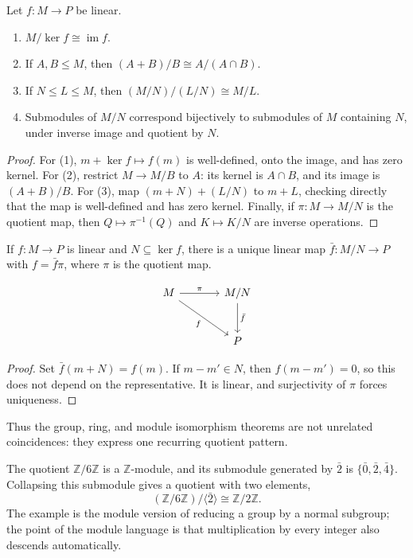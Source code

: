 \begin{theorem}
Let \(f:M\to P\) be linear.
\begin{enumerate}
\item \(M/\ker f\cong\operatorname{im}f\).
\item If \(A,B\leq M\), then \((A+B)/B\cong A/(A\cap B)\).
\item If \(N\leq L\leq M\), then \((M/N)/(L/N)\cong M/L\).
\item Submodules of \(M/N\) correspond bijectively to submodules of \(M\)
containing \(N\), under inverse image and quotient by \(N\).
\end{enumerate}
\end{theorem}
\begin{proof}
For (1), \(m+\ker f\mapsto f(m)\) is well-defined, onto the image, and has
zero kernel. For (2), restrict \(M\to M/B\) to \(A\): its kernel is
\(A\cap B\), and its image is \((A+B)/B\). For (3), map
\((m+N)+(L/N)\) to \(m+L\), checking directly that the map is well-defined
and has zero kernel. Finally, if \(\pi:M\to M/N\) is the quotient map,
then \(Q\mapsto\pi^{-1}(Q)\) and \(K\mapsto K/N\) are inverse operations.
\end{proof}

\begin{theorem}
If \(f:M\to P\) is linear and \(N\subseteq\ker f\), there is a unique
linear map \(\bar f:M/N\to P\) with \(f=\bar f\pi\), where \(\pi\) is the
quotient map.
\end{theorem}
\[
\begin{tikzcd}[column sep=large, row sep=large]
M \arrow[r, "\pi"] \arrow[dr, "f"'] & M/N \arrow[d, "\bar f"] \\
& P
\end{tikzcd}
\]
\begin{proof}
Set \(\bar f(m+N)=f(m)\). If \(m-m'\in N\), then \(f(m-m')=0\), so this
does not depend on the representative. It is linear, and surjectivity of
\(\pi\) forces uniqueness.
\end{proof}

Thus the group, ring, and module isomorphism theorems are not unrelated
coincidences: they express one recurring quotient pattern.

\begin{example}
The quotient \(\mathbb Z/6\mathbb Z\) is a \(\mathbb Z\)-module, and its
submodule generated by \(\bar2\) is \(\{\bar0,\bar2,\bar4\}\). Collapsing
this submodule gives a quotient with two elements,
\[(\mathbb Z/6\mathbb Z)/\langle\bar2\rangle\cong\mathbb Z/2\mathbb Z.
\]
The example is the module version of reducing a group by a normal subgroup;
the point of the module language is that multiplication by every integer also
descends automatically.
\end{example}

